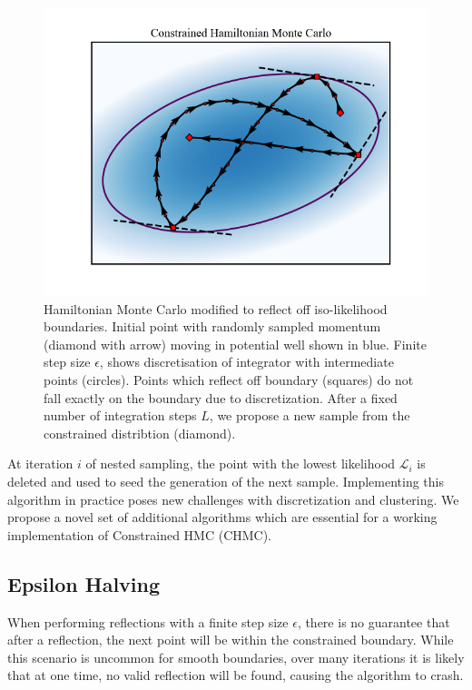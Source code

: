 \documentclass[11pt]{article}
\begin{document}
    \begin{figure}[t!]
        \center
        \includegraphics[width=\linewidth]{../figures/ConstrainedHMC}
        \caption{
        Hamiltonian Monte Carlo modified to reflect off iso-likelihood boundaries. Initial point with randomly sampled
        momentum (diamond with arrow) moving in potential well shown in blue. Finite step size $\epsilon$, shows discretisation of
        integrator with intermediate points (circles). Points which reflect off boundary (squares) do not fall exactly on
        the boundary due to discretization. After a fixed number of integration steps $L$, we propose a new sample from the
        constrained distribtion (diamond).
        }\label{fig:constrainedhmc}
    \end{figure}

    At iteration $i$ of nested sampling, the point with the lowest likelihood $\mathcal{L}_i$ is deleted and used to
    seed the generation of the next sample.
    Implementing this algorithm in practice poses new challenges with discretization and clustering.
    We propose a novel set of additional algorithms which are essential for a working implementation of
    Constrained HMC (CHMC).

    \subsection{Epsilon Halving}
    When performing reflections with a finite step size $\epsilon$, there is no guarantee that after a reflection,
    the next point will be within the constrained boundary.
    While this scenario is uncommon for smooth boundaries, over many iterations it is likely that at one time,
    no valid reflection will be found, causing the algorithm to crash.
\end{document}
